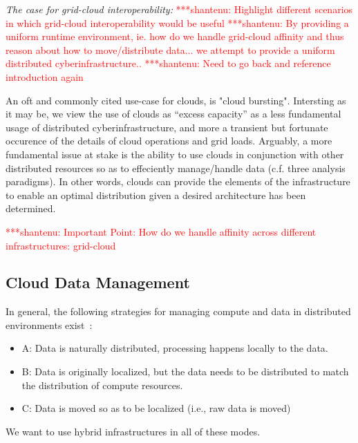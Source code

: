 \documentclass[times]{cpeauth}
\newcommand{\jhanote}[1]{ {\textcolor{red} { ***shantenu: #1 }}}
\newcommand{\jhanote}[1]{}
\begin{document}

{\it The case for grid-cloud interoperability:} \jhanote{Highlight
  different scenarios in which grid-cloud interoperability would be
  useful} \jhanote{By providing a uniform runtime environment, ie.
  how do we handle grid-cloud affinity and thus reason about how to
  move/distribute data... we attempt to provide a uniform distributed
  cyberinfrastructure..} \jhanote{Need to go back and reference
  introduction again}

An oft and commonly cited use-case for clouds, is "cloud bursting".
Intersting as it may be, we view the use of clouds as ``excess
capacity'' as a less fundamental usage of distributed
cyberinfrastructure, and more a transient but fortunate occurence of
the details of cloud operations and grid loads. Arguably, a more
fundamental issue at stake is the ability to use clouds in conjunction
with other distributed resources so as to effeciently manage/handle
data (c.f. three analysis paradigms).  In other words, clouds can
provide the elements of the infrastructure to enable an optimal
distribution given a desired architecture has been determined.

\jhanote{Important Point: How do we handle affinity across different
  infrastructures: grid-cloud}





\subsection{Cloud Data Management}

In general, the following strategies for managing compute and
data in distributed environments exist~\cite{jha-katz-2013}:
\begin{itemize}
\item A: Data is naturally distributed, processing happens locally to
  the data.
\item B: Data is originally localized, but the data needs to be distributed to match the distribution of compute resources.
\item C: Data is moved so as to be localized (i.e., raw data is moved)
\end{itemize}
We want to use hybrid infrastructures in all of these modes.
\end{document}
